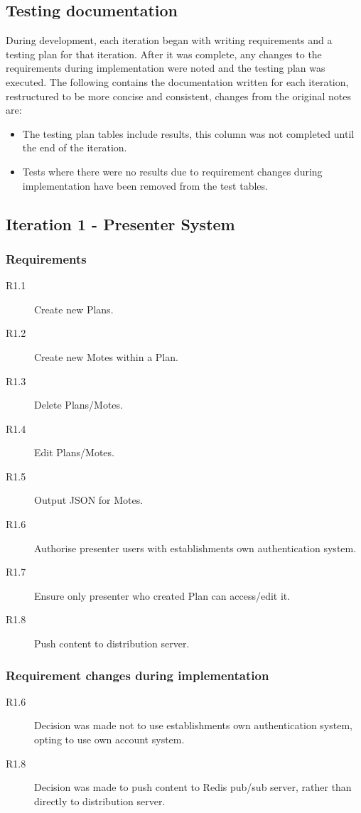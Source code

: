 \documentclass[a4papert,11pt,notitlepage]{article}
\begin{document}
\begin{appendices}
\pagebreak
\section{Testing documentation}
\label{app:testing}
During development, each iteration began with writing requirements and a testing plan for that iteration. After it was complete, any changes to the requirements during implementation were noted and the testing plan was executed. The following contains the documentation written for each iteration, restructured to be more concise and consistent, changes from the original notes are:
\begin{itemize}
\item The testing plan tables include results, this column was not completed until the end of the iteration.
\item Tests where there were no results due to requirement changes during implementation have been removed from the test tables.
\end{itemize}

\subsection{Iteration 1 - Presenter System}
\subsubsection{Requirements}
\begin{description}
\item[R1.1] Create new Plans.
\item[R1.2] Create new Motes within a Plan.
\item[R1.3] Delete Plans/Motes.
\item[R1.4] Edit Plans/Motes.
\item[R1.5] Output JSON for Motes.
\item[R1.6] Authorise presenter users with establishments own authentication system.
\item[R1.7] Ensure only presenter who created Plan can access/edit it. 
\item[R1.8] Push content to distribution server.
\end{description}

\subsubsection{Requirement changes during implementation}
\begin{description}
\item[R1.6] Decision was made not to use establishments own authentication system, opting to use own account system.
\item[R1.8] Decision was made to push content to Redis pub/sub server, rather than directly to distribution server.
\end{description}


\end{appendices}
\end{document}
